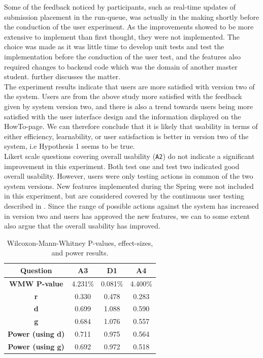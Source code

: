Some of the feedback noticed by participants, such as real-time updates of submission placement in the run-queue, was actually in the making shortly before the conduction of the user experiment. As the improvements showed to be more extensive to implement than first thought, they were not implemented. The choice was made as it was little time to develop unit tests and test the implementation before the conduction of the user test, and the features also required changes to backend code which was the domain of another master student.  further discusses the matter. \\

The experiment results indicate that users are more satisfied with version two of the system. Users are from the above study more satisfied with the feedback given by system version two, and there is also a trend towards users being more satisfied with the user interface design and the information displayed on the HowTo-page. We can therefore conclude that it is likely that usability in terms of either efficiency, learnability, or user satisfaction is better in version two of the system, i.e Hypothesis 1 seems to be true. \\

Likert scale questions covering overall usability (\texttt{A2}) do not indicate a significant improvement in this experiment. Both test one and test two indicated good overall usability. However, users were only testing actions in common of the two system versions. New features implemented during the Spring were not included in this experiment, but are considered covered by the continuous user testing described in . Since the range of possible actions against the system has increased in version two and users has approved the new features, we can to some extent also argue that the overall usability has improved.

\begin{table}[t!]
    \centering
    \begin{tabular}{|c||c||c||c||}
      \hline
      \textbf{Question} & \textbf{A3} & \textbf{D1} & \textbf{A4} \\\hline
      \textbf{WMW P-value} & 4.231\% & 0.081\% & 4.400\%  \\ \hline
      \textbf{r} & 0.330 & 0.478 & 0.283\\ \hline
      \textbf{d} & 0.699 & 1.088 & 0.590 \\ \hline
      \textbf{g} & 0.684 & 1.076 & 0.557\\ \hline
      \textbf{Power (using d)} & 0.711 & 0.975 & 0.564 \\ \hline
      \textbf{Power (using g)} & 0.692 & 0.972 & 0.518 \\ \hline
    \end{tabular}
    \caption{Wilcoxon-Mann-Whitney P-values, effect-sizes, and power results.}
    \label{tab:significant-results}
\end{table}


